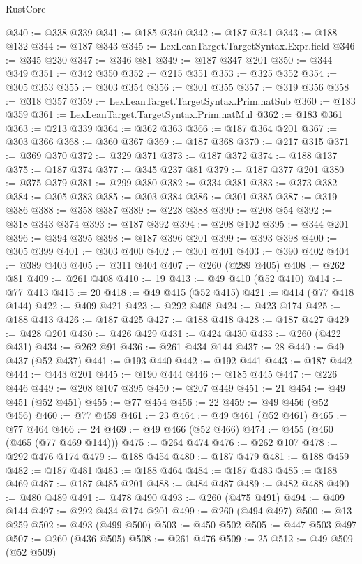 \begin{lexlean}{RustCore}
\begin{coremodule}
@340 := @338 @339
@341 := @185 @340
@342 := @187 @341
@343 := @188 @132
@344 := @187 @343
@345 := LexLeanTarget.TargetSyntax.Expr.field
@346 := @345 @230
@347 := @346 @81
@349 := @187 @347 @201
@350 := @344 @349
@351 := @342 @350
@352 := @215 @351
@353 := @325 @352
@354 := @305 @353
@355 := @303 @354
@356 := @301 @355
@357 := @319 @356
@358 := @318 @357
@359 := LexLeanTarget.TargetSyntax.Prim.natSub
@360 := @183 @359
@361 := LexLeanTarget.TargetSyntax.Prim.natMul
@362 := @183 @361
@363 := @213 @339
@364 := @362 @363
@366 := @187 @364 @201
@367 := @303 @366
@368 := @360 @367
@369 := @187 @368
@370 := @217 @315
@371 := @369 @370
@372 := @329 @371
@373 := @187 @372
@374 := @188 @137
@375 := @187 @374
@377 := @345 @237 @81
@379 := @187 @377 @201
@380 := @375 @379
@381 := @299 @380
@382 := @334 @381
@383 := @373 @382
@384 := @305 @383
@385 := @303 @384
@386 := @301 @385
@387 := @319 @386
@388 := @358 @387
@389 := @228 @388
@390 := @208 @54
@392 := @318 @343 @374
@393 := @187 @392
@394 := @208 @102
@395 := @344 @201
@396 := @394 @395
@398 := @187 @396 @201
@399 := @393 @398
@400 := @305 @399
@401 := @303 @400
@402 := @301 @401
@403 := @390 @402
@404 := @389 @403
@405 := @311 @404
@407 := @260 (@289 @405)
@408 := @262 @81
@409 := @261 @408
@410 := 19
@413 := @49 @410 (@52 @410)
@414 := @77 @413
@415 := 20
@418 := @49 @415 (@52 @415)
@421 := @414 (@77 @418 @144)
@422 := @409 @421
@423 := @292 @408
@424 := @423 @174
@425 := @188 @413
@426 := @187 @425
@427 := @188 @418
@428 := @187 @427
@429 := @428 @201
@430 := @426 @429
@431 := @424 @430
@433 := @260 (@422 @431)
@434 := @262 @91
@436 := @261 @434 @144
@437 := 28
@440 := @49 @437 (@52 @437)
@441 := @193 @440
@442 := @192 @441
@443 := @187 @442
@444 := @443 @201
@445 := @190 @444
@446 := @185 @445
@447 := @226 @446
@449 := @208 @107 @395
@450 := @207 @449
@451 := 21
@454 := @49 @451 (@52 @451)
@455 := @77 @454
@456 := 22
@459 := @49 @456 (@52 @456)
@460 := @77 @459
@461 := 23
@464 := @49 @461 (@52 @461)
@465 := @77 @464
@466 := 24
@469 := @49 @466 (@52 @466)
@474 := @455 (@460 (@465 (@77 @469 @144)))
@475 := @264 @474
@476 := @262 @107
@478 := @292 @476 @174
@479 := @188 @454
@480 := @187 @479
@481 := @188 @459
@482 := @187 @481
@483 := @188 @464
@484 := @187 @483
@485 := @188 @469
@487 := @187 @485 @201
@488 := @484 @487
@489 := @482 @488
@490 := @480 @489
@491 := @478 @490
@493 := @260 (@475 @491)
@494 := @409 @144
@497 := @292 @434 @174 @201
@499 := @260 (@494 @497)
@500 := @13 @259
@502 := @493 (@499 @500)
@503 := @450 @502
@505 := @447 @503 @497
@507 := @260 (@436 @505)
@508 := @261 @476
@509 := 25
@512 := @49 @509 (@52 @509)

\end{coremodule}
\end{lexlean}
